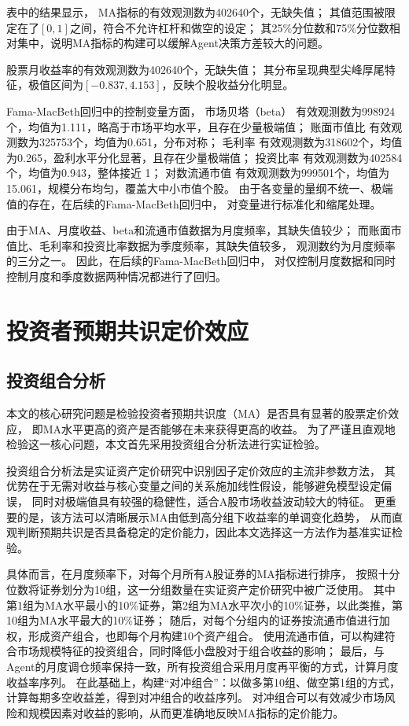 表中的结果显示，
MA指标的有效观测数为402640个，无缺失值；
其值范围被限定在了$[0, 1]$之间，符合不允许杠杆和做空的设定；
其25\%分位数和75\%分位数相对集中，说明MA指标的构建可以缓解Agent决策方差较大的问题。

股票月收益率的有效观测数为402640个，无缺失值；
其分布呈现典型尖峰厚尾特征，极值区间为$[-0.837, 4.153]$，反映个股收益分化明显。

Fama-MacBeth回归中的控制变量方面，
市场贝塔（beta） 有效观测数为998924个，均值为1.111，略高于市场平均水平，且存在少量极端值；
账面市值比 有效观测数为325753个，均值为0.651，分布对称；
毛利率 有效观测数为318602个，均值为0.265，盈利水平分化显著，且存在少量极端值；
投资比率 有效观测数为402584个，均值为0.943，整体接近 1；
对数流通市值 有效观测数为999501个，均值为15.061，规模分布均匀，覆盖大中小市值个股。
由于各变量的量纲不统一、极端值的存在，在后续的Fama-MacBeth回归中，
对变量进行标准化和缩尾处理。

由于MA、月度收益、beta和流通市值数据为月度频率，其缺失值较少；
而账面市值比、毛利率和投资比率数据为季度频率，其缺失值较多，
观测数约为月度频率的三分之一。
因此，在后续的Fama-MacBeth回归中，
对仅控制月度数据和同时控制月度和季度数据两种情况都进行了回归。

\section{投资者预期共识定价效应}

\subsection{投资组合分析}
本文的核心研究问题是检验投资者预期共识度（MA）是否具有显著的股票定价效应，
即MA水平更高的资产是否能够在未来获得更高的收益。
为了严谨且直观地检验这一核心问题，本文首先采用投资组合分析法进行实证检验。

投资组合分析法是实证资产定价研究中识别因子定价效应的主流非参数方法，
其优势在于无需对收益与核心变量之间的关系施加线性假设，能够避免模型设定偏误，
同时对极端值具有较强的稳健性，适合A股市场收益波动较大的特征。
更重要的是，该方法可以清晰展示MA由低到高分组下收益率的单调变化趋势，
从而直观判断预期共识是否具备稳定的定价能力，因此本文选择这一方法作为基准实证检验。

具体而言，在月度频率下，对每个月所有A股证券的MA指标进行排序，
按照十分位数将证券划分为10组，这一分组数量在实证资产定价研究中被广泛使用。
其中第1组为MA水平最小的10\%证券，第2组为MA水平次小的10\%证券，以此类推，第10组为MA水平最大的10\%证券；
随后，对每个分组内的证券按流通市值进行加权，形成资产组合，也即每个月构建10个资产组合。
使用流通市值，可以构建符合市场规模特征的投资组合，同时降低小盘股对于组合收益的影响；
最后，与Agent的月度调仓频率保持一致，所有投资组合采用月度再平衡的方式，计算月度收益率序列。
在此基础上，构建“对冲组合”：以做多第10组、做空第1组的方式，计算每期多空收益差，得到对冲组合的收益序列。
对冲组合可以有效减少市场风险和规模因素对收益的影响，从而更准确地反映MA指标的定价能力。

